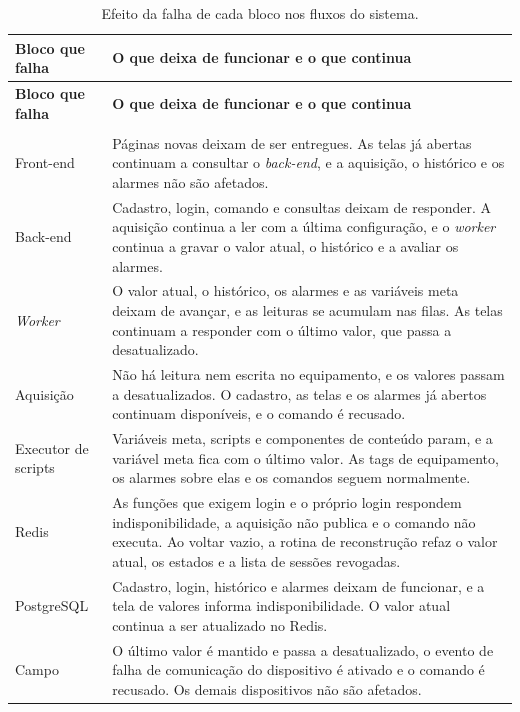 {\renewcommand{\arraystretch}{1.3}\small
\begin{xltabular}{\textwidth}{>{\raggedright\arraybackslash}p{3.2cm}>{\raggedright\arraybackslash}X}
    \caption{Efeito da falha de cada bloco nos fluxos do sistema.}
    \label{tab:fx_falhas}\\
    \hline
    \textbf{Bloco que falha} & \textbf{O que deixa de funcionar e o que continua} \\
    \hline
    \endfirsthead
    \hline
    \textbf{Bloco que falha} & \textbf{O que deixa de funcionar e o que continua} \\
    \hline
    \endhead
    \endfoot
     \\
    \endlastfoot
    Front-end & Páginas novas deixam de ser entregues. As telas já abertas continuam a consultar o \emph{back-end}, e a aquisição, o histórico e os alarmes não são afetados. \\
    \hline
    Back-end & Cadastro, login, comando e consultas deixam de responder. A aquisição continua a ler com a última configuração, e o \emph{worker} continua a gravar o valor atual, o histórico e a avaliar os alarmes. \\
    \hline
    \emph{Worker} & O valor atual, o histórico, os alarmes e as variáveis meta deixam de avançar, e as leituras se acumulam nas filas. As telas continuam a responder com o último valor, que passa a desatualizado. \\
    \hline
    Aquisição & Não há leitura nem escrita no equipamento, e os valores passam a desatualizados. O cadastro, as telas e os alarmes já abertos continuam disponíveis, e o comando é recusado. \\
    \hline
    Executor de scripts & Variáveis meta, scripts e componentes de conteúdo param, e a variável meta fica com o último valor. As tags de equipamento, os alarmes sobre elas e os comandos seguem normalmente. \\
    \hline
    Redis & As funções que exigem login e o próprio login respondem indisponibilidade, a aquisição não publica e o comando não executa. Ao voltar vazio, a rotina de reconstrução refaz o valor atual, os estados e a lista de sessões revogadas. \\
    \hline
    PostgreSQL & Cadastro, login, histórico e alarmes deixam de funcionar, e a tela de valores informa indisponibilidade. O valor atual continua a ser atualizado no Redis. \\
    \hline
    Campo & O último valor é mantido e passa a desatualizado, o evento de falha de comunicação do dispositivo é ativado e o comando é recusado. Os demais dispositivos não são afetados. \\
    \hline
\end{xltabular}}

